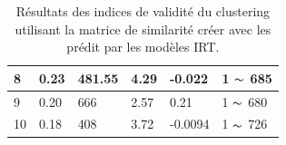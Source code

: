 \begin{table}[H]
\begin{tabular}{|m{2cm}|m{2cm}|m{2cm}|m{2cm}|m{2cm}|m{3cm}|}
	8  & 0.23  & 481.55  & 4.29   &  -0.022  &  1   \(\displaystyle \thicksim  \)  685 \\ \hline
	9  & 0.20  & 666     & 2.57   &  0.21    &  1   \(\displaystyle \thicksim  \)  680 \\ \hline
	10 & 0.18  & 408     & 3.72   &  -0.0094 &  1   \(\displaystyle \thicksim  \)  726 \\ \hline
  \end{tabular}
	\caption{Résultats des indices de validité du clustering utilisant la matrice de similarité créer avec les prédit par les modèles IRT.}
	\label{clusters_indice_score0}
\end{table}
